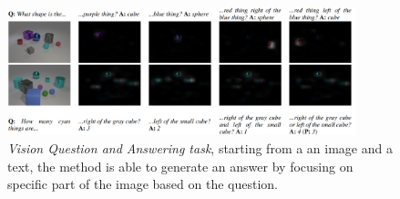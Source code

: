 \begin{figure}[htb]
    \centering
    \includegraphics[width=0.9\textwidth]{Figures/images/film/film_attention.png}
    \caption{\textit{Vision Question and Answering task}, starting from a an image and a text, the method is able to generate an answer by focusing on specific part of the image based on the question.}
    \label{fig:film_attention}
\end{figure}

